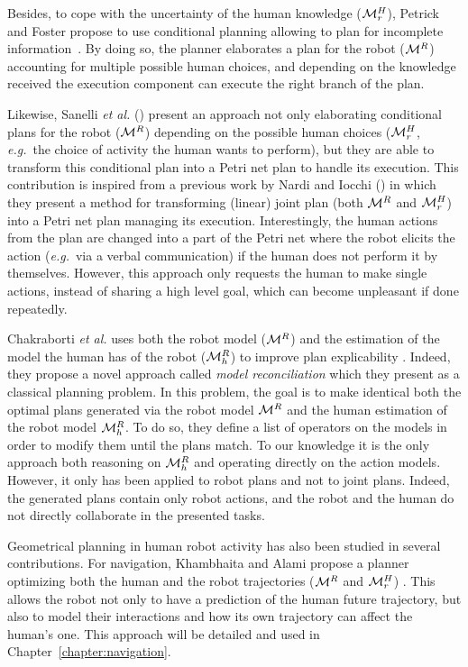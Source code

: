 \documentclass[a4paper,11pt,twoside]{StyleThese}
\begin{document}
Besides, to cope with the uncertainty of the human knowledge ($\mathcal{M}^H_r$), Petrick and Foster propose to use conditional planning allowing to plan for incomplete information~\cite{petrick2013planning}. By doing so, the planner elaborates a plan for the robot ($\mathcal{M}^R$) accounting for multiple possible human choices, and depending on the knowledge received the execution component can execute the right branch of the plan.

Likewise, Sanelli \textit{et al.} (\cite{sanelli2017short}) present an approach not only elaborating conditional plans for the robot ($\mathcal{M}^R$)  depending on the possible human choices ($\mathcal{M}^H_r$, \textit{e.g.}~the choice of activity the human wants to perform), but they are able to transform this conditional plan into a Petri net plan to handle its execution. This contribution is inspired from a previous work by Nardi and Iocchi (\cite{nardi2014representation}) in which they present a method for transforming (linear) joint plan (both $\mathcal{M}^R$ and $\mathcal{M}^H_r$) into a Petri net plan managing its execution. Interestingly, the human actions from the plan are changed into a part of the Petri net where the robot elicits the action (\textit{e.g.}~via a verbal communication) if the human does not perform it by themselves. However, this approach only requests the human to make single actions, instead of sharing a high level goal, which can become unpleasant if done repeatedly. 

Chakraborti \textit{et al.} uses both the robot model ($\mathcal{M}^R$) and the estimation of the model the human has of the robot ($\mathcal{M}^R_h$) to improve plan explicability \cite{chakraborti2017plan}. Indeed, they propose a novel approach called \textit{model reconciliation} which they present as a classical planning problem. In this problem, the goal is to make identical both the optimal plans generated via the robot model $\mathcal{M}^R$ and the human estimation of the robot model $\mathcal{M}^R_h$. To do so, they define a list of operators on the models in order to modify them until the plans match. To our knowledge it is the only approach both reasoning on $\mathcal{M}^R_h$ and operating directly on the action models. However, it only has been applied to robot plans and not to joint plans. Indeed, the generated plans contain only robot actions, and the robot and the human do not directly collaborate in the presented tasks.

\medskip
Geometrical planning in human robot activity has also been studied in several contributions. For navigation, Khambhaita and Alami propose a planner optimizing both the human and the robot trajectories ($\mathcal{M}^R$ and $\mathcal{M}^H_r$) \cite{khambhaita_viewing_2017}. This allows the robot not only to have a prediction of the human future trajectory, but also to model their interactions and how its own trajectory can affect the human's one. This approach will be detailed and used in Chapter~\ref{chapter:navigation}.
\end{document}
